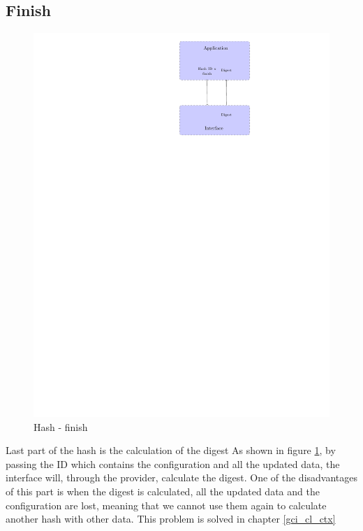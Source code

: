 \subsection*{Finish}
\begin{figure}[!ht]
\centering
\includegraphics[trim=18.5cm 20cm 9.5cm 0cm]{figures/hash_example_finish.pdf}
\caption{Hash - finish\newline}
\label{fig:gci_hash_finish}
\end{figure}
Last part of the hash is the calculation of the digest\newline
As shown in figure \ref{fig:gci_hash_finish}, by passing the ID which contains
the configuration and all the updated data, the interface will, through the provider, calculate the digest.\newline
One of the disadvantages of this part is when the digest is calculated, all the
updated data and the configuration are lost, meaning that we cannot use them
again to calculate another hash with other data.\newline
This problem is solved in chapter \ref{gci_cl_ctx}
\newpage
